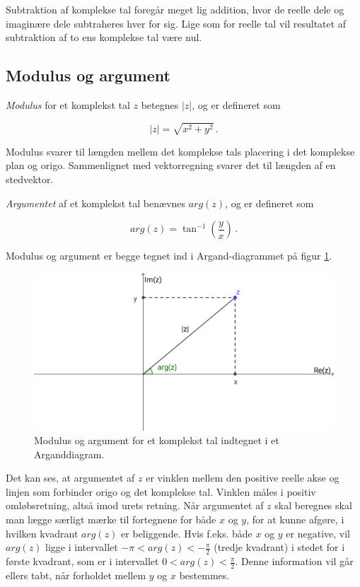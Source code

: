 \documentclass[a4paper, 12pt,titlepage]{article}
\begin{document}
Subtraktion af komplekse tal foregår meget lig addition, hvor de reelle dele og imaginære dele subtraheres hver for sig. Lige som for reelle tal vil resultatet af subtraktion af to ens komplekse tal være nul.

\subsection{Modulus og argument}
\label{sec:orgc47fe78}

\emph{Modulus} for et komplekst tal \(z\) betegnes \(\lvert z \rvert\), og er defineret som

\begin{equation}
\label{modulus}
    \lvert z \rvert = \sqrt{x^2 + y^2} \, . 
\end{equation}

Modulus svarer til længden mellem det komplekse tals placering i det komplekse plan og origo. Sammenlignet med vektorregning svarer det til længden af en stedvektor.

\emph{Argumentet} af et komplekst tal benævnes \(arg(z)\), og er defineret som

\begin{equation}
\label{argument}
    arg(z) = \tan^{-1} \left(\frac{y}{x}\right) \,. 
\end{equation}

Modulus og argument er begge tegnet ind i Argand-diagrammet på figur \ref{modulus_og_argument}.

\begin{figure}[htbp]
\centering
\includegraphics[width=.9\linewidth]{./img/modulus_og_argument.png}
\caption{\label{modulus_og_argument}Modulus og argument for et komplekst tal indtegnet i et Arganddiagram.}
\end{figure}

Det kan ses, at argumentet af \(z\) er vinklen mellem den positive reelle akse og linjen som forbinder origo og det komplekse tal. Vinklen måles i positiv omløbsretning, altså imod urets retning. Når argumentet af \(z\) skal beregnes skal man lægge særligt mærke til fortegnene for både \(x\) og \(y\), for at kunne afgøre, i hvilken kvadrant \(arg(z)\) er beliggende. Hvis f.eks. både \(x\) og \(y\) er negative, vil \(arg(z)\) ligge i intervallet \(-\pi < arg(z) < -\frac{\pi}{2}\) (tredje kvadrant) i stedet for i første kvadrant, som er i intervallet \(0 < arg(z) < \frac{\pi}{2}\). Denne information vil går ellers tabt, når forholdet mellem \(y\) og \(x\) bestemmes.
\end{document}
